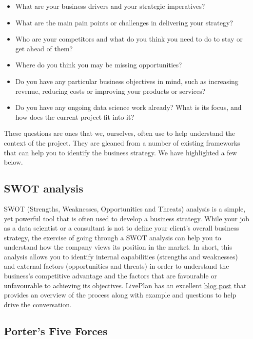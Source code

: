 \documentclass[]{book}
\providecommand{\tightlist}{%
  \setlength{\itemsep}{0pt}\setlength{\parskip}{0pt}}
\begin{document}
\begin{itemize}
\tightlist
\item
  What are your business drivers and your strategic imperatives?
\item
  What are the main pain points or challenges in delivering your
  strategy?
\item
  Who are your competitors and what do you think you need to do to stay
  or get ahead of them?
\item
  Where do you think you may be missing opportunities?
\item
  Do you have any particular business objectives in mind, such as
  increasing revenue, reducing costs or improving your products or
  services?
\item
  Do you have any ongoing data science work already? What is its focus,
  and how does the current project fit into it?
\end{itemize}

These questions are ones that we, ourselves, often use to help
understand the context of the project. They are gleaned from a number of
existing frameworks that can help you to identify the business strategy.
We have highlighted a few below.

\hypertarget{swot-analysis}{%
\subsection{SWOT analysis}\label{swot-analysis}}

SWOT (Strengths, Weaknesses, Opportunities and Threats) analysis is a
simple, yet powerful tool that is often used to develop a business
strategy. While your job as a data scientist or a consultant is not to
define your client's overall business strategy, the exercise of going
through a SWOT analysis can help you to understand how the company views
its position in the market. In short, this analysis allows you to
identify internal capabilities (strengths and weaknesses) and external
factors (opportunities and threats) in order to understand the
business's competitive advantage and the factors that are favourable or
unfavourable to achieving its objectives. LivePlan has an excellent
\href{https://www.liveplan.com/blog/what-is-a-swot-analysis-and-how-to-do-it-right-with-examples/}{blog
post} that provides an overview of the process along with example and
questions to help drive the conversation.

\hypertarget{porters-five-forces}{%
\subsection{Porter's Five Forces}\label{porters-five-forces}}
\end{document}
